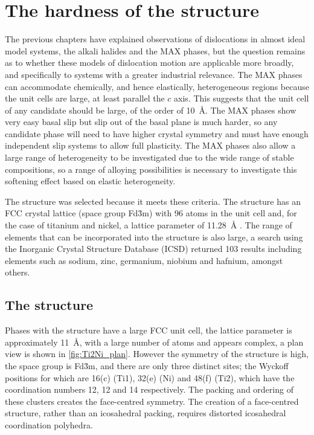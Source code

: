 

\chapter{\texorpdfstring{The hardness of the  structure}{The hardness of the Ti2Ni structure}}
\graphicspath{{hardness_of_ti_2_ni/Figs/}}
\label{chap:ti2ni_hardness}



The previous chapters have explained observations of dislocations in almost ideal model systems, the alkali halides and the MAX phases, but the question remains as to whether these models of dislocation motion are applicable more broadly, and specifically to systems with a greater industrial relevance. The MAX phases can accommodate chemically, and hence elastically, heterogeneous regions because the unit cells are large, at least parallel the $c$ axis. This suggests that the unit cell of any candidate should be large, of the order of \SI{10}{\angstrom}. The MAX phases show very easy basal slip but slip out of the basal plane is much harder, so any candidate phase will need to have higher crystal symmetry and must have enough independent slip systems to allow full plasticity. The MAX phases also allow a large range of heterogeneity to be investigated due to the wide range of stable compositions, so a range of alloying possibilities is necessary to investigate this softening effect based on elastic heterogeneity.

The  structure was selected because it meets these criteria. The structure has an FCC crystal lattice (space group Fd\={3}m) with 96 atoms in the unit cell and, for the case of titanium and nickel, a lattice parameter of \SI{11.28}{\angstrom} \cite{Yurko1959,Yurko1962}. The range of elements that can be incorporated into the structure is also large, a search using the Inorganic Crystal Structure Database (ICSD) \cite{ICSD} returned 103 results including elements such as sodium, zinc, germanium, niobium and hafnium, amongst others.

\section{The \texorpdfstring{}{Ti2Ni} structure}
\FloatBarrier


Phases with the  structure have a large FCC unit cell, the lattice parameter is approximately \SI{11}{\angstrom}, with a large number of atoms and appears complex, a plan view is shown in \autoref{fig:Ti2Ni_plan}. However the symmetry of the structure is high, the space group is Fd\={3}m, and there are only three distinct sites; the Wyckoff positions for which are 16(c) (Ti1), 32(e) (Ni) and 48(f) (Ti2), which have the coordination numbers 12, 12 and 14 respectively. The packing and ordering of these clusters creates the face-centred symmetry. The creation of a face-centred structure, rather than an icosahedral packing, requires distorted icosahedral coordination polyhedra.


